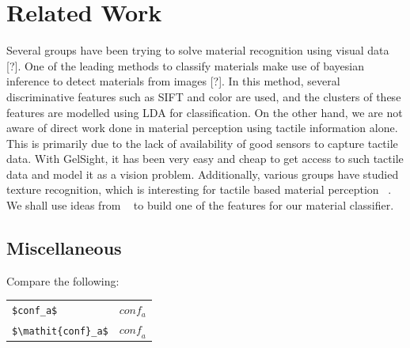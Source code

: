 \documentclass[10pt,twocolumn,letterpaper]{article}
\begin{document}
\section{Related Work}
Several groups have been trying to solve material recognition using visual data [?]. One of the leading methods to classify materials make use of bayesian inference
to detect materials from images [?]. In this method, several discriminative features such as SIFT and color are used, and the clusters of these features are modelled using LDA for classification.
On the other hand, we are not aware of direct work done in material perception using tactile information alone. This is primarily due to the lack of availability of good sensors to capture tactile data. 
With GelSight, it has been very easy and cheap to get access to such tactile data and model it as a vision problem. Additionally, various groups have studied texture recognition, which is interesting
for tactile based material perception ~\cite{textons,lbpv}. We shall use ideas from ~\cite{lbpv} to build one of the features for our material classifier. 












\subsection{Miscellaneous}

\noindent
Compare the following:\\
\begin{tabular}{ll}
 \verb'$conf_a$' &  $conf_a$ \\
 \verb'$\mathit{conf}_a$' & $\mathit{conf}_a$
\end{tabular}\\



\end{document}
